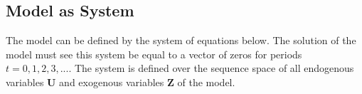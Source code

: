 \documentclass[titlepage]{\econtex}\providecommand{\texname}{FBS-NK}
\begin{document}









\hypertarget{Model as System}{}
\subsection{Model as System}

The model can be defined by the system of equations below. The solution of the model must see this system be equal to a vector of zeros for periods $t =0, 1, 2, 3, ...$. The system is defined over the sequence space of all endogenous variables $\mathbf{U}$  and exogenous variables $\mathbf{Z}$ of the model. \\
\end{document}
